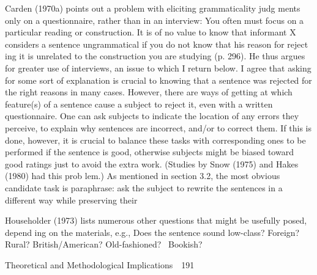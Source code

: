 \begin{styleStandard}
Carden (1970a) points out a problem with eliciting grammaticality judg\- ments only on a questionnaire, rather than in an interview: {\textquotedbl}You often must focus on a particular reading or construction. It is of no value to know that informant X considers a sentence ungrammatical if you do not know that his reason for reject\- ing it is unrelated to the construction you are studying{\textquotedbl} (p. 296). He thus argues for greater use of interviews, an issue to which I return below. I agree that asking for some sort of explanation is crucial to knowing that a sentence was rejected for the right reasons in many cases. However, there are ways of getting at which feature(s) of a sentence cause a subject to reject it, even with a written questionnaire. One can ask subjects to indicate the location of any errors they perceive, to explain why sentences are incorrect, and/or to correct them. If this is done, however, it is crucial to balance these tasks with corresponding ones to be performed if the sentence is good, otherwise subjects might be biased toward good ratings just to avoid the extra work. (Studies by Snow (1975) and Hakes (1980) had this prob\- lem.) As mentioned in section 3.2, the most obvious candidate task is paraphrase: ask the subject to rewrite the sentences in a different way while preserving their
\end{styleStandard}


\begin{listWWNumxviiileveli}
\item 
\begin{styleStandard}
Householder (1973) lists numerous other questions that might be usefully posed, depend\- ing on the materials, e.g., Does the sentence sound low-class? Foreign? Rural? British/American? Old-fashioned? \ Bookish?
\end{styleStandard}


\end{listWWNumxviiileveli}
\clearpage\setcounter{page}{1}\begin{styleStandard}
Theoretical and Methodological Implications\ \ 191
\end{styleStandard}


